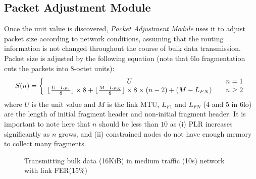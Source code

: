 \documentclass[runningheads,a4paper]{llncs}
\begin{document}
\subsection{Packet Adjustment Module} \label{sec:pa}
Once the unit value is discovered, \emph{Packet Adjustment Module} uses it to adjust packet size according to network conditions, assuming that the routing information is not changed throughout the course of bulk data transmission. Packet size is adjusted by the following equation (note that 6lo fragmentation cuts the packets into 8-octet units):
\begin{equation} \label{eq:size}
S(n) = \left\{
  \begin{array}{c l}
    U & \quad n=1 \\
    \lfloor \frac{U-L_{F1}}{8} \rfloor \times 8 + \lfloor \frac{M-L_{FN}}{8} \rfloor \times 8 \times (n-2) + (M-L_{FN}) & \quad n \ge 2
  \end{array}
\right.
\end{equation}
where $U$ is the unit value and $M$ is the link MTU, $L_{F1}$ and $L_{FN}$ (4 and 5 in 6lo) are the length of initial fragment header and non-initial fragment header. It is important to note here that $n$ should be less than $10$ as (i) PLR increases significantly as $n$ grows, and (ii) constrained nodes do not have enough memory to collect many fragments.

\begin{figure}
	\vspace{-15pt}
	\centering
	\caption{Transmitting bulk data (16KiB) in medium traffic (10s) network with link FER(15\%)}
	\label{fig:pa}
	\vspace{-15pt}
\end{figure}
\end{document}
